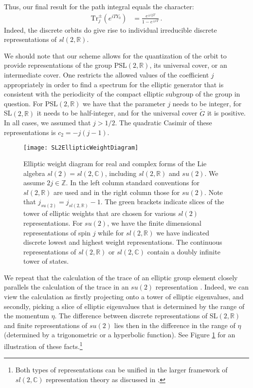 \documentclass[12pt]{article}
\numberwithin{equation}{section}
\numberwithin{equation}{section}
\numberwithin{table}{section}\setlength{\multlinegap}{25pt}
\begin{document}
Thus, our final result for the path integral equals the character:
\begin{align}
\text{Tr}_j^\pm \left( e^{ iT Y_0} \right)  &=  
\frac{e^{ \pm i j   T}}{1-e^{\pm i   T}} 
\, .
\end{align}
Indeed, the discrete orbits do give rise to individual irreducible discrete representations of $sl(2,\mathbb{R})$. 

We should note that our scheme
allows for the quantization of the orbit to provide representations of the group  PSL$(2,\mathbb{R})$, its universal cover, or an intermediate cover. One restricts the allowed values of the coefficient $j$ appropriately in order to find a spectrum for the elliptic generator that is consistent with the periodicity of the compact elliptic subgroup of the group in question. For PSL$(2,\mathbb{R})$ we have that the parameter $j$ needs to be integer, for SL$(2,\mathbb{R})$ it needs to be half-integer, and for the universal cover $\widetilde{G}$ it is positive. In all cases, we assumed that $j>1/2$. The quadratic Casimir of these representations is $c_2=-j(j-1)$. 

\begin{figure}
\begin{center}
\texttt{[image: SL2EllipticWeightDiagram]}
\end{center}
\caption{Elliptic weight diagram for real and complex forms of the Lie algebra  $sl(2)=sl(2,\mathbb{C})$, including $sl(2,\mathbb{R})$ and $su(2)$. We assume $2j \in \mathbb{Z}$. In the left column standard conventions for $sl(2,\mathbb{R})$ are used and in the right column those for $su(2)$. Note that $j_{su(2)} = j_{sl(2,\mathbb{R})}-1$. The green brackets indicate slices of the tower of elliptic weights that are chosen for various $sl(2)$ representations. For $su(2)$, we have the finite dimensional representations of spin $j$ while for $sl(2,\mathbb{R})$ we have indicated discrete lowest and highest weight representations. The continuous representations of $sl(2,\mathbb{R})$ or $sl(2,\mathbb{C})$ contain a doubly infinite tower of states. }
\label{SL2EllipticWeightDiagram}
\end{figure}
We repeat that the calculation of the trace of an elliptic group element closely parallels the  calculation of the trace in an $su(2)$ representation \cite{Vergne,Alekseev:1988vx,Troost:2003ge}. Indeed, we can view the calculation as firstly projecting onto a tower of elliptic eigenvalues, and secondly, picking a slice of elliptic eigenvalues that is determined by the range of the momentum $\eta$. The difference between discrete representations of SL$(2,\mathbb{R})$ and finite representations of $su(2)$ lies then in the difference in the range of $\eta$ (determined by a trigonometric or a hyperbolic function). 
See Figure \ref{SL2EllipticWeightDiagram} for an illustration of these facts.\footnote{
Both types of representations can be unified in the larger framework of $sl(2,\mathbb{C})$ representation theory as discussed in \cite{Troost:2012ck}.  }
\end{document}
